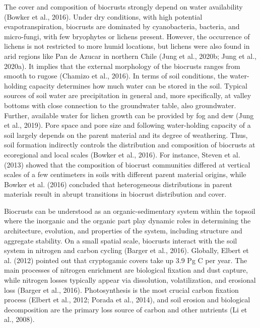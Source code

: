 {The cover and composition of biocrusts strongly depend on water availability (Bowker et al., 2016). Under dry conditions, with high potential evapotranspiration, biocrusts are dominated by cyanobacteria, bacteria, and micro-fungi, with few bryophytes or lichens present. However, the occurrence of lichens is not restricted to more humid locations, but lichens were also found in arid regions like Pan de Azucar in northern Chile (Jung et al., 2020b; Jung et al., 2020a). It implies that the external morphology of the biocrusts ranges from smooth to rugose (Chamizo et al., 2016). In terms of soil conditions, the water-holding capacity determines how much water can be stored in the soil. Typical sources of soil water are precipitation in general and, more specifically, at valley bottoms with close connection to the groundwater table, also groundwater. Further, available water for lichen growth can be provided by fog and dew (Jung et al., 2019). Pore space and pore size and following water-holding capacity of a soil largely depends on the parent material and its degree of weathering. Thus, soil formation indirectly controls the distribution and composition of biocrusts at ecoregional and local scales (Bowker et al., 2016). For instance, Steven et al. (2013) showed that the composition of biocrust communities differed at vertical scales of a few centimeters in soils with different parent material origins, while Bowker et al. (2016) concluded that heterogeneous distributions in parent materials result in abrupt transitions in biocrust distribution and cover.

Biocrusts can be understood as an organic-sedimentary system within the topsoil where the inorganic and the organic part play dynamic roles in determining the architecture, evolution, and properties of the system, including structure and aggregate stability. On a small spatial scale, biocrusts interact with the soil system in nitrogen and carbon cycling (Barger et al., 2016). Globally, Elbert et al. (2012) pointed out that cryptogamic covers take up 3.9 Pg C per year. The main processes of nitrogen enrichment are biological fixation and dust capture, while nitrogen losses typically appear via dissolution, volatilization, and erosional loss (Barger et al., 2016). Photosynthesis is the most crucial carbon fixation process (Elbert et al., 2012; Porada et al., 2014), and soil erosion and biological decomposition are the primary loss source of carbon and other nutrients (Li et al., 2008).

}
